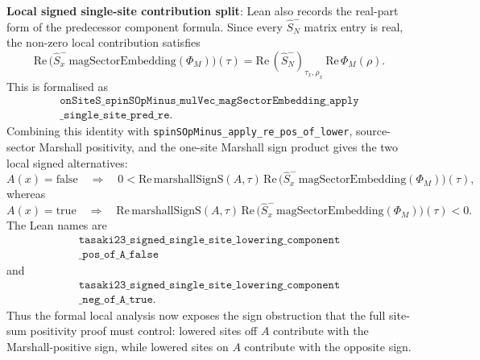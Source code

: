 \documentclass[a4paper,11pt]{article}
\begin{document}
\textbf{Local signed single-site contribution split}: Lean also records
the real-part form of the predecessor component formula.  Since every
\(\hat S^-_N\) matrix entry is real, the non-zero local contribution
satisfies
\[
  \mathrm{Re}\,
  \bigl(\hat S^-_x\,\mathrm{magSectorEmbedding}(\Phi_M)\bigr)(\tau)
  =
  \mathrm{Re}\,(\hat S^-_N)_{\tau_x,\rho_x}\,
  \mathrm{Re}\,\Phi_M(\rho).
\]
This is formalised as
\[
\begin{gathered}
\texttt{onSiteS\_spinSOpMinus\_mulVec\_magSectorEmbedding\_apply}\\
\texttt{\_single\_site\_pred\_re}.
\end{gathered}
\]
Combining this identity with
\texttt{spinSOpMinus\_apply\_re\_pos\_of\_lower}, source-sector
Marshall positivity, and the one-site Marshall sign product gives the
two local signed alternatives:
\[
  A(x)=\mathrm{false}
  \quad\Rightarrow\quad
  0 <
  \mathrm{Re}\,\mathrm{marshallSignS}(A,\tau)\,
  \mathrm{Re}\,
  \bigl(\hat S^-_x\,\mathrm{magSectorEmbedding}(\Phi_M)\bigr)(\tau),
\]
whereas
\[
  A(x)=\mathrm{true}
  \quad\Rightarrow\quad
  \mathrm{Re}\,\mathrm{marshallSignS}(A,\tau)\,
  \mathrm{Re}\,
  \bigl(\hat S^-_x\,\mathrm{magSectorEmbedding}(\Phi_M)\bigr)(\tau)
  < 0 .
\]
The Lean names are
\[
\begin{gathered}
\texttt{tasaki23\_signed\_single\_site\_lowering\_component}\\
\texttt{\_pos\_of\_A\_false}
\end{gathered}
\]
and
\[
\begin{gathered}
\texttt{tasaki23\_signed\_single\_site\_lowering\_component}\\
\texttt{\_neg\_of\_A\_true}.
\end{gathered}
\]
Thus the formal local analysis now exposes the sign obstruction that
the full site-sum positivity proof must control: lowered sites off
\(A\) contribute with the Marshall-positive sign, while lowered sites
on \(A\) contribute with the opposite sign.
\end{document}
